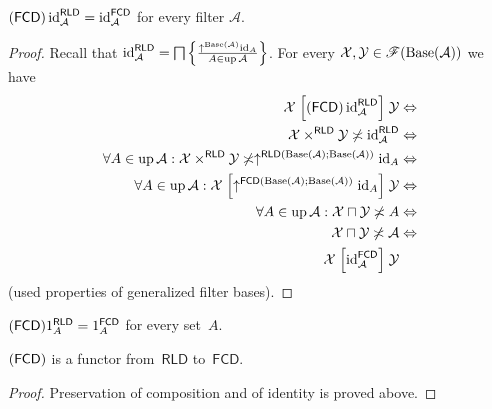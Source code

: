 \begin{prop}
$(\mathsf{FCD})\operatorname{id}_{\mathcal{A}}^{\mathsf{RLD}}=\operatorname{id}_{\mathcal{A}}^{\mathsf{FCD}}$
for every filter $\mathcal{A}$.\end{prop}
\begin{proof}
Recall that $\operatorname{id}_{\mathcal{A}}^{\mathsf{RLD}}=\bigsqcap\left\{ \frac{\uparrow^{\operatorname{Base}(\mathcal{A})}\operatorname{id}_{A}}{A\in\operatorname{up}\mathcal{A}}\right\}$.
For every $\mathcal{X},\mathcal{Y}\in\mathscr{F}(\operatorname{Base}(\mathcal{A}))$ we
have
\begin{align*}
\mathcal{X}\mathrel{\left[(\mathsf{FCD})\operatorname{id}_{\mathcal{A}}^{\mathsf{RLD}}\right]}\mathcal{Y} & \Leftrightarrow\\
\mathcal{X}\times^{\mathsf{RLD}}\mathcal{Y}\not\asymp\operatorname{id}_{\mathcal{A}}^{\mathsf{RLD}} & \Leftrightarrow\\
\forall A\in\operatorname{up}\mathcal{A}:\mathcal{X}\times^{\mathsf{RLD}}\mathcal{Y}\not\asymp\uparrow^{\mathsf{RLD}(\operatorname{Base}(\mathcal{A});\operatorname{Base}(\mathcal{A}))}\operatorname{id}_{A} & \Leftrightarrow\\
\forall A\in\operatorname{up}\mathcal{A}:\mathcal{X}\mathrel{\left[\uparrow^{\mathsf{FCD}(\operatorname{Base}(\mathcal{A});\operatorname{Base}(\mathcal{A}))}\operatorname{id}_{A}\right]}\mathcal{Y} & \Leftrightarrow\\
\forall A\in\operatorname{up}\mathcal{A}:\mathcal{X}\sqcap\mathcal{Y}\not\asymp A & \Leftrightarrow\\
\mathcal{X}\sqcap\mathcal{Y}\not\asymp\mathcal{A} & \Leftrightarrow\\
\mathcal{X}\mathrel{\left[\operatorname{id}_{\mathcal{A}}^{\mathsf{FCD}}\right]}\mathcal{Y}
\end{align*}
(used properties of generalized filter bases).\end{proof}
\begin{cor}
$(\mathsf{FCD})1_{A}^{\mathsf{RLD}}=1_{A}^{\mathsf{FCD}}$ for every set~$A$.\end{cor}
\begin{prop}
$(\mathsf{FCD})$ is a functor from~$\mathsf{RLD}$ to~$\mathsf{FCD}$.\end{prop}
\begin{proof}
Preservation of composition and of identity is proved above.
\end{proof}

